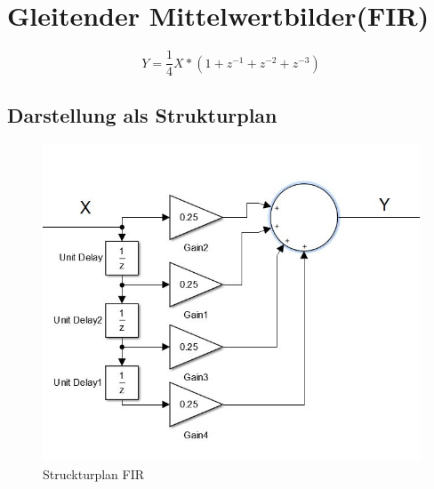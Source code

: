 \documentclass[12pt,a4paper]{report}
\begin{document}
\chapter{Gleitender Mittelwertbilder(FIR)}

\begin{equation}
Y = \frac{1}{4}X*(1+z^{-1}+z^{-2}+z^{-3})
\end{equation}

\section{Darstellung als Strukturplan}
\begin{figure}[ht]
	\centering
	\includegraphics[width=0.8\linewidth]{marius/FIR}
	\caption{Struckturplan FIR}
	\label{fig:FIR}
\end{figure}
\end{document}

